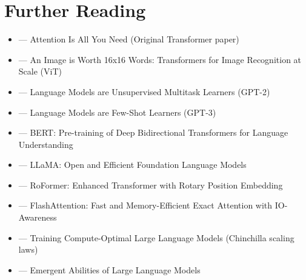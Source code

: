 \section{Further Reading}

\begin{itemize}
    \item \cite{vaswani2017attention} --- Attention Is All You Need (Original Transformer paper)
    \item \cite{dosovitskiy2020image} --- An Image is Worth 16x16 Words: Transformers for Image Recognition at Scale (ViT)
    \item \cite{radford2019language} --- Language Models are Unsupervised Multitask Learners (GPT-2)
    \item \cite{brown2020language} --- Language Models are Few-Shot Learners (GPT-3)
    \item \cite{devlin2018bert} --- BERT: Pre-training of Deep Bidirectional Transformers for Language Understanding
    \item \cite{touvron2023llama} --- LLaMA: Open and Efficient Foundation Language Models
    \item \cite{su2021roformer} --- RoFormer: Enhanced Transformer with Rotary Position Embedding
    \item \cite{dao2022flashattention} --- FlashAttention: Fast and Memory-Efficient Exact Attention with IO-Awareness
    \item \cite{hoffmann2022training} --- Training Compute-Optimal Large Language Models (Chinchilla scaling laws)
    \item \cite{wei2022emergent} --- Emergent Abilities of Large Language Models
\end{itemize}

